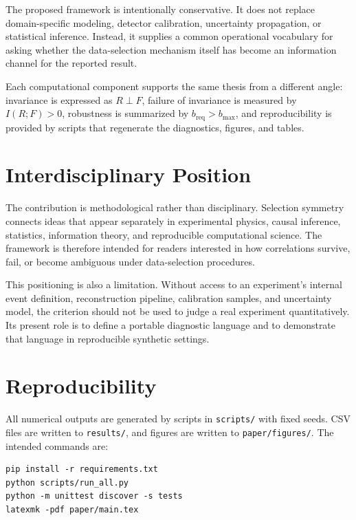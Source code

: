 \documentclass[11pt]{article}
\begin{document}
The proposed framework is intentionally conservative. It does not replace domain-specific modeling, detector calibration, uncertainty propagation, or statistical inference. Instead, it supplies a common operational vocabulary for asking whether the data-selection mechanism itself has become an information channel for the reported result.

Each computational component supports the same thesis from a different angle: invariance is expressed as \(R\perp F\), failure of invariance is measured by \(I(R;F)>0\), robustness is summarized by \(b_{\mathrm{req}}>b_{\max}\), and reproducibility is provided by scripts that regenerate the diagnostics, figures, and tables.

\section{Interdisciplinary Position}

The contribution is methodological rather than disciplinary. Selection symmetry connects ideas that appear separately in experimental physics, causal inference, statistics, information theory, and reproducible computational science. The framework is therefore intended for readers interested in how correlations survive, fail, or become ambiguous under data-selection procedures.

This positioning is also a limitation. Without access to an experiment's internal event definition, reconstruction pipeline, calibration samples, and uncertainty model, the criterion should not be used to judge a real experiment quantitatively. Its present role is to define a portable diagnostic language and to demonstrate that language in reproducible synthetic settings.

\section{Reproducibility}

All numerical outputs are generated by scripts in \texttt{scripts/} with fixed seeds. CSV files are written to \texttt{results/}, and figures are written to \texttt{paper/figures/}. The intended commands are:
\begin{verbatim}
pip install -r requirements.txt
python scripts/run_all.py
python -m unittest discover -s tests
latexmk -pdf paper/main.tex
\end{verbatim}
\end{document}
